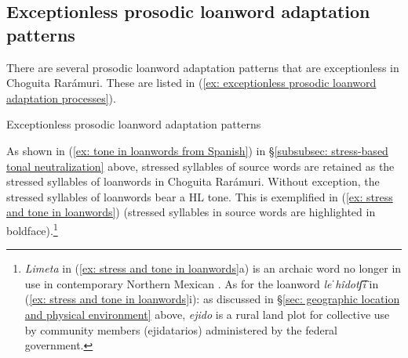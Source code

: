 \subsection{Exceptionless prosodic loanword adaptation patterns}
\label{subsec: exceptionless prosodic loanword adaptation patterns}

There are several prosodic loanword adaptation patterns that are exceptionless in Choguita Rarámuri. These are listed in (\ref{ex: exceptionless prosodic loanword  adaptation processes}).

\pagebreak

\ea\label{ex: exceptionless prosodic loanword  adaptation processes}
{Exceptionless prosodic loanword adaptation patterns}\mbox{}
    \z
\z

As shown in (\ref{ex: tone in loanwords from Spanish}) in §\ref{subsubsec: stress-based tonal neutralization} above, stressed syllables of  source words are retained as the stressed syllables of loanwords in Choguita Rarámuri. Without exception, the stressed syllables of loanwords bear a HL tone. This is exemplified in (\ref{ex: stress and tone in loanwords}) (stressed syllables in  source words are highlighted in boldface).\footnote{\textit{Limeta} in (\ref{ex: stress and tone in loanwords}a) is an archaic word no longer in use in contemporary Northern Mexican . As for the loanword \textit{leˈhîdotʃ͡i} in (\ref{ex: stress and tone in loanwords}i): as discussed in §\ref{sec: geographic location and physical environment} above, \textit{ejido} is a rural land plot for collective use by community members (ejidatarios) administered by the federal government.}

